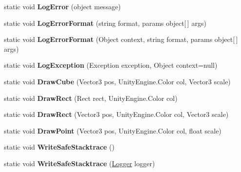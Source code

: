 \begin{DoxyCompactItemize}
static void {\bfseries Log\+Error} (object message)
\item 
\mbox{\label{class_lerp2_a_p_i_1_1_debug_handler_1_1_debug_aa1c9900532d4fcb6c673b01fb14b6352}} 
static void {\bfseries Log\+Error\+Format} (string format, params object\mbox{[}$\,$\mbox{]} args)
\item 
\mbox{\label{class_lerp2_a_p_i_1_1_debug_handler_1_1_debug_aad68742c2b2112ce82e9862e09a39b3d}} 
static void {\bfseries Log\+Error\+Format} (Object context, string format, params object\mbox{[}$\,$\mbox{]} args)
\item 
\mbox{\label{class_lerp2_a_p_i_1_1_debug_handler_1_1_debug_a984646787c0fa3290d91b30753788b59}} 
static void {\bfseries Log\+Exception} (Exception exception, Object context=null)
\item 
\mbox{\label{class_lerp2_a_p_i_1_1_debug_handler_1_1_debug_ad7c54a31817298c9edf073589b6ec626}} 
static void {\bfseries Draw\+Cube} (Vector3 pos, Unity\+Engine.\+Color col, Vector3 scale)
\item 
\mbox{\label{class_lerp2_a_p_i_1_1_debug_handler_1_1_debug_a32dadb2127cd477f95b1c59b318ae264}} 
static void {\bfseries Draw\+Rect} (Rect rect, Unity\+Engine.\+Color col)
\item 
\mbox{\label{class_lerp2_a_p_i_1_1_debug_handler_1_1_debug_ab363f960da7aa20cf0d70e9ff8b34afc}} 
static void {\bfseries Draw\+Rect} (Vector3 pos, Unity\+Engine.\+Color col, Vector3 scale)
\item 
\mbox{\label{class_lerp2_a_p_i_1_1_debug_handler_1_1_debug_aaba4867c125f893fa1b159075124e5c6}} 
static void {\bfseries Draw\+Point} (Vector3 pos, Unity\+Engine.\+Color col, float scale)
\item 
\mbox{\label{class_lerp2_a_p_i_1_1_debug_handler_1_1_debug_aaa25f28b7f0c29bf9ef3bf5f4da0fbe0}} 
static void {\bfseries Write\+Safe\+Stacktrace} ()
\item 
\mbox{\label{class_lerp2_a_p_i_1_1_debug_handler_1_1_debug_aaefdca576ca6f8f6f5cde3fc63894289}} 
static void {\bfseries Write\+Safe\+Stacktrace} (\hyperlink{class_lerp2_a_p_i_1_1_safe_e_calls_1_1_logger}{Logger} logger)
\end{DoxyCompactItemize}
